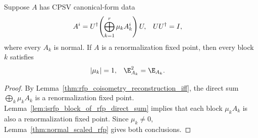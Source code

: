 \begin{lemma}%
    \label{thm:cpsv_weight_norm_one_and_block_rfp}
    \leanok
    Suppose $A$ has CPSV canonical-form data
    \begin{align}
        A^i
         & =U^\dagger\!\left(\bigoplus_{k=1}^r\mu_kA_k^i\right)U,
         & UU^\dagger                                             & =I,
        \notag
    \end{align}
    where every $A_k$ is normal. If $A$ is a renormalization fixed point, then
    every block $k$ satisfies
    \begin{align}
        |\mu_k| & =1,
                & \E_{A_k}^2 & =\E_{A_k}.
        \notag
    \end{align}
\end{lemma}
\begin{proof}\leanok
    By Lemma~\ref{thm:rfp_coisometry_reconstruction_iff}, the direct sum
    $\bigoplus_k\mu_kA_k$ is a renormalization fixed point.
    Lemma~\ref{lem:isrfp_block_of_rfp_direct_sum} implies that each block
    $\mu_kA_k$ is also a renormalization fixed point. Since $\mu_k\ne0$,
    Lemma~\ref{thm:normal_scaled_rfp} gives both conclusions.
\end{proof}

